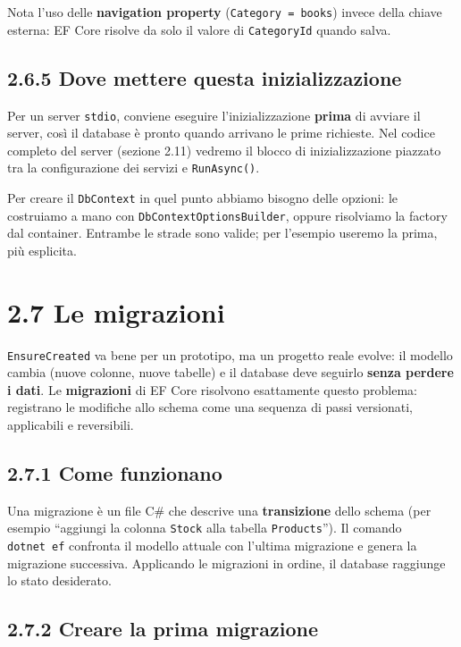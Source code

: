 \documentclass[
  italian,
  10pt,
]{book}
\begin{document}
Nota l'uso delle \textbf{navigation property}
(\texttt{Category\ =\ books}) invece della chiave esterna: EF Core
risolve da solo il valore di \texttt{CategoryId} quando salva.

\subsection{2.6.5 Dove mettere questa
inizializzazione}\label{dove-mettere-questa-inizializzazione}

Per un server \texttt{stdio}, conviene eseguire l'inizializzazione
\textbf{prima} di avviare il server, così il database è pronto quando
arrivano le prime richieste. Nel codice completo del server (sezione
2.11) vedremo il blocco di inizializzazione piazzato tra la
configurazione dei servizi e \texttt{RunAsync()}.

Per creare il \texttt{DbContext} in quel punto abbiamo bisogno delle
opzioni: le costruiamo a mano con \texttt{DbContextOptionsBuilder},
oppure risolviamo la factory dal container. Entrambe le strade sono
valide; per l'esempio useremo la prima, più esplicita.

\section{2.7 Le migrazioni}\label{le-migrazioni}

\texttt{EnsureCreated} va bene per un prototipo, ma un progetto reale
evolve: il modello cambia (nuove colonne, nuove tabelle) e il database
deve seguirlo \textbf{senza perdere i dati}. Le \textbf{migrazioni} di
EF Core risolvono esattamente questo problema: registrano le modifiche
allo schema come una sequenza di passi versionati, applicabili e
reversibili.

\subsection{2.7.1 Come funzionano}\label{come-funzionano}

Una migrazione è un file C\# che descrive una \textbf{transizione} dello
schema (per esempio ``aggiungi la colonna \texttt{Stock} alla tabella
\texttt{Products}''). Il comando \texttt{dotnet\ ef} confronta il
modello attuale con l'ultima migrazione e genera la migrazione
successiva. Applicando le migrazioni in ordine, il database raggiunge lo
stato desiderato.

\subsection{2.7.2 Creare la prima
migrazione}\label{creare-la-prima-migrazione}
\end{document}
